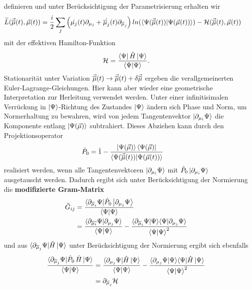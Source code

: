 definieren und unter Berücksichtigung der Parametrisierung erhalten wir
\begin{align}
        \widetilde{L}(\vec{\overline{\mu}}(t),\vec{\mu}(t)) &= \frac{i}{2}\sum_j\left(\dot{\mu_j}(t)\partial_{\mu_j} + \dot{\overline{\mu}_j}(t)\partial_{\overline{\mu}_j}\right)
        ln(\langle\Psi(\vec{\overline{\mu}}(t))|\Psi(\vec{\mu}(t))\rangle) - \mathcal{H}(\vec{\overline{\mu}}(t),\vec{\mu}(t))
\end{align}
mit der effektiven Hamilton-Funktion
\begin{align}
    \mathcal{H} = \frac{\bra{\Psi}\hat{H}\ket{\Psi}}{\bra{\Psi}\ket{\Psi}}.
\end{align}
Stationarität unter Variation $\vec{\overline{\mu}}(t)\rightarrow \vec{\overline{\mu}}(t) + \delta\vec{\overline{\mu}}$ ergeben die 
verallgemeinerten Euler-Lagrange-Gleichungen. Hier kann aber wieder eine geometrische Interpretation zur Herleitung verwendet werden. Unter einer 
infinitisimalen Verrückung in $\ket{\Psi}$-Richtung des Zustandes $\ket{\Psi}$ ändern sich Phase und Norm, um Normerhaltung zu bewahren, wird von jedem 
Tangentenvektor $\ket{\partial_{\mu_i}\Psi}$ die Komponente entlang $\ket{\Psi(\vec{\mu})}$ subtrahiert. Dieses Abziehen kann durch den 
Projektionsoperator 
\begin{align}
    \hat{P}_0 &= \hat{1} - \frac{\ket{\Psi(\vec{\mu})}\bra{\Psi(\vec{\mu})}}{\langle\Psi(\vec{\overline{\mu}}(t))|\Psi(\vec{\mu}(t))\rangle}
\end{align}
realisiert werden, wenn alle Tangentenvektoren $\ket{\partial_{\mu_i}\Psi}$ mit $\hat{P}_0\ket{\partial_{\mu_i}\Psi}$ ausgetauscht werden.
Dadurch ergibt sich unter Berücksichtigung der Normierung die \textbf{modifizierte Gram-Matrix}
\begin{align}
    \tilde{G}_{ij} &= \frac{\langle\partial_{\overline{\mu}_i}\Psi|\hat{P}_0\ket{\partial_{\mu_j}\Psi}}{\bra{\Psi}\ket{\Psi}}  \nonumber \\
    &= \frac{\langle\partial_{\overline{\mu_i}}\Psi|\partial_{\mu_j}\Psi\rangle}{\bra{\Psi}\ket{\Psi}}
    - \frac{\langle\partial_{\overline{\mu}_i}\Psi|\Psi\rangle\langle\Psi|\partial_{\mu_j}\Psi\rangle}{\bra{\Psi}\ket{\Psi}^2}
\end{align}
und aus $ \langle\partial_{\overline{\mu}_j}\Psi|\hat{H}\ket{\Psi}$ unter Berücksichtigung der Normierung ergibt sich ebenfalls
\begin{align}
    \frac{\langle\partial_{\overline{\mu}_j}\Psi|\hat{P}_0\thinspace\hat{H}\ket{\Psi}}{\langle\Psi|\Psi\rangle}    
                &= \frac{\langle\partial_{\mu_j}\Psi|\hat{H}\ket{\Psi}}{\bra{\Psi}\ket{\Psi}} 
                - \frac{\langle\partial_{\mu_j}\Psi|\Psi\rangle\langle\Psi|\hat{H}\ket{\Psi}}{\bra{\Psi}\ket{\Psi}^2} \nonumber \\
                &= \partial_{\overline{\mu}_j}\mathcal{H}                
\end{align}


